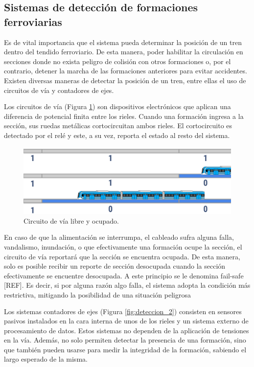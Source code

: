 \subsection{Sistemas de detección de formaciones ferroviarias}

Es de vital importancia que el sistema pueda determinar la posición de un tren dentro del tendido ferroviario. De esta manera, poder habilitar la circulación en secciones donde no exista peligro de colisión con otros formaciones o, por el contrario, detener la marcha de las formaciones anteriores para evitar accidentes. Existen diversas maneras de detectar la posición de un tren, entre ellas el uso de circuitos de vía y contadores de ejes. 

Los circuitos de vía (Figura \ref{fig:deteccion_1}) son dispositivos electrónicos que aplican una diferencia de potencial finita entre los rieles. Cuando una formación ingresa a la sección, sus ruedas metálicas cortocircuitan ambos rieles. El cortocircuito es detectado por el relé y este, a su vez, reporta el estado al resto del sistema. 

    \begin{figure}[!h]
        \centering
        \includegraphics[width=1\textwidth]{Figuras/circuito_via}
        \centering\caption{Circuito de vía libre y ocupado.}
        \label{fig:deteccion_1}
    \end{figure}

En caso de que la alimentación se interrumpa, el cableado sufra alguna falla, vandalismo, inundación, o que efectivamente una formación ocupe la sección, el circuito de vía reportará que la sección se encuentra ocupada. De esta manera, solo es posible recibir un reporte de sección desocupada cuando la sección efectivamente se encuentre desocupada. A este principio se le denomina fail-safe [REF]. Es decir, si por alguna razón algo falla, el sistema adopta la condición más restrictiva, mitigando la posibilidad de una situación peligrosa

Los sistemas contadores de ejes (Figura \ref{fig:deteccion_2}) consisten en sensores pasivos instalados en la cara interna de unos de los rieles y un sistema externo de procesamiento de datos. Estos sistemas no dependen de la aplicación de tensiones en la vía. Además, no solo permiten detectar la presencia de una formación, sino que también pueden usarse para medir la integridad de la formación, sabiendo el largo esperado de la misma. 


